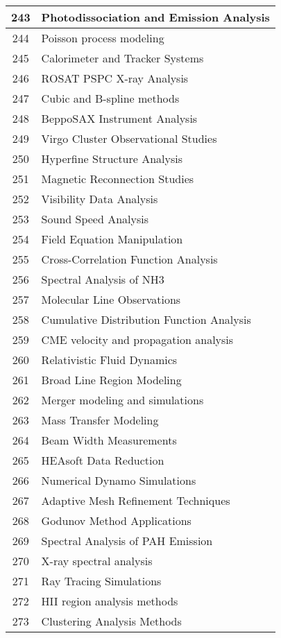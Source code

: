 \begin{table}[htbp]
\begin{tabular}{|c|l|}
\hline
243 & Photodissociation and Emission Analysis \\
\hline
244 & Poisson process modeling \\
\hline
245 & Calorimeter and Tracker Systems \\
\hline
246 & ROSAT PSPC X-ray Analysis \\
\hline
247 & Cubic and B-spline methods \\
\hline
248 & BeppoSAX Instrument Analysis \\
\hline
249 & Virgo Cluster Observational Studies \\
\hline
250 & Hyperfine Structure Analysis \\
\hline
251 & Magnetic Reconnection Studies \\
\hline
252 & Visibility Data Analysis \\
\hline
253 & Sound Speed Analysis \\
\hline
254 & Field Equation Manipulation \\
\hline
255 & Cross-Correlation Function Analysis \\
\hline
256 & Spectral Analysis of NH3 \\
\hline
257 & Molecular Line Observations \\
\hline
258 & Cumulative Distribution Function Analysis \\
\hline
259 & CME velocity and propagation analysis \\
\hline
260 & Relativistic Fluid Dynamics \\
\hline
261 & Broad Line Region Modeling \\
\hline
262 & Merger modeling and simulations \\
\hline
263 & Mass Transfer Modeling \\
\hline
264 & Beam Width Measurements \\
\hline
265 & HEAsoft Data Reduction \\
\hline
266 & Numerical Dynamo Simulations \\
\hline
267 & Adaptive Mesh Refinement Techniques \\
\hline
268 & Godunov Method Applications \\
\hline
269 & Spectral Analysis of PAH Emission \\
\hline
270 & X-ray spectral analysis \\
\hline
271 & Ray Tracing Simulations \\
\hline
272 & HII region analysis methods \\
\hline
273 & Clustering Analysis Methods \\

\end{tabular}
\end{table}
